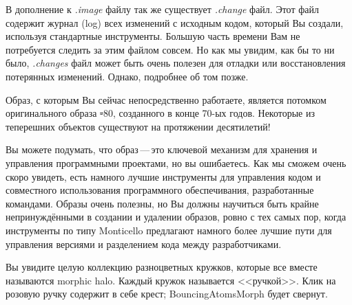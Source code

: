 \documentclass[a4paper,10pt,twoside]{book}
\begin{document}
В дополнение к \emph{.image} файлу так же существует \emph{.change}
файл. Этот файл содержит журнал (log) всех изменений с исходным
кодом, который Вы создали, используя стандартные инструменты.
Большую часть времени Вам не потребуется следить за этим файлом
совсем. Но как мы увидим, как бы то ни было, \emph{.changes} файл
может быть очень полезен для отладки или восстановления
потерянных изменений. Однако, подробнее об том позже.


Образ, с которым Вы сейчас непосредственно работаете,
является потомком оригинального образа \st-80,
созданного в конце 70-ых годов. Некоторые из теперешних
объектов существуют на протяжении десятилетий!


Вы можете подумать, что образ\,---\,это ключевой механизм для
хранения и управления программными проектами, но вы ошибаетесь.
Как мы сможем очень скоро увидеть, есть намного лучшие инструменты
для управления кодом и совместного использования программного
обеспечивания, разработанные командами. Образы очень полезны, но Вы
должны научиться быть крайне непринуждёнными в создании и удалении
образов, ровно с тех самых пор, когда инструменты по типу Monticello
предлагают намного более лучшие пути для управления версиями и
разделением кода между разработчиками. 


Вы увидите целую коллекцию разноцветных кружков,
которые все вместе называются morphic halo.
Каждый кружок называется <<ручкой>>. Клик на розовую ручку
содержит в себе крест; BouncingAtomsMorph будет свернут. 
\end{document}
